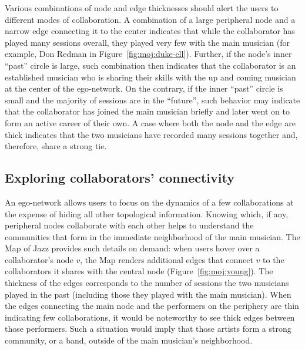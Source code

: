 \documentclass[12pt]{cmuthesis}
\begin{document}
  Various combinations of node and edge thicknesses should alert the users to different modes of collaboration. A combination of a large peripheral node and a narrow edge connecting it to the center indicates that while the collaborator has played many sessions overall, they played very few with the main musician (for example, Don Redman in Figure~\ref{fig:moj:duke-ell}). Further, if the node's inner ``past'' circle is large, such combination then indicates that the collaborator is an established musician who is sharing their skills with the up and coming musician at the center of the ego-network. On the contrary, if the inner ``past'' circle is small and the majority of sessions are in the ``future'', such behavior may indicate that the collaborator has joined the main musician briefly and later went on to form an active career of their own. A case where both the node and the edge are thick indicates that the two musicians have recorded many sessions together and, therefore, share a strong tie.


  \subsection{Exploring collaborators' connectivity}

  An ego-network allows users to focus on the dynamics of a few collaborations at the expense of hiding all other topological information. Knowing which, if any, peripheral nodes collaborate with each other helps to understand the communities that form in the immediate neighborhood of the main musician. The Map of Jazz provides such details on demand: when users hover over a collaborator's node $v$, the Map renders additional edges that connect $v$ to the collaborators it shares with the central node (Figure~\ref{fig:moj:young}). The thickness of the edges corresponds to the number of sessions the two musicians played in the past (including those they played with the main musician). When the edges connecting the main node and the performers on the periphery are thin indicating few collaborations, it would be noteworthy to see thick edges between those performers. Such a situation would imply that those artists form a strong community, or a band, outside of the main musician's neighborhood.

\end{document}

